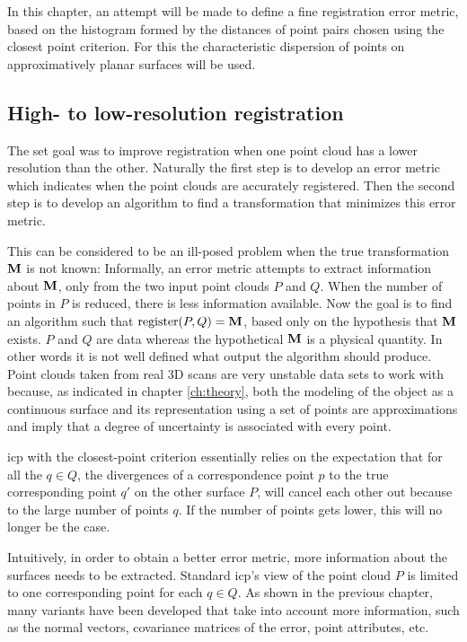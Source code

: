 In this chapter, an attempt will be made to define a fine registration error metric, based on the histogram formed by the distances of point pairs chosen using the closest point criterion. For this the characteristic dispersion of points on approximatively planar surfaces will be used.


\subsection{High- to low-resolution registration}
The set goal was to improve registration when one point cloud has a lower resolution than the other. Naturally the first step is to develop an error metric which indicates when the point clouds are accurately registered. Then the second step is to develop an algorithm to find a transformation that minimizes this error metric.

This can be considered to be an ill-posed problem when the true transformation $\mathbf{M}$ is not known: Informally, an error metric attempts to extract information about $\mathbf{M}$, only from the two input point clouds $P$ and $Q$. When the number of points in $P$ is reduced, there is less information available. Now the goal is to find an algorithm such that $\text{register}(P, Q) = \mathbf{M}$, based only on the hypothesis that $\mathbf{M}$ exists. $P$ and $Q$ are data whereas the hypothetical $\mathbf{M}$ is a physical quantity. In other words it is not well defined what output the algorithm should produce. Point clouds taken from real 3D scans are very unstable data sets to work with because, as indicated in chapter \ref{ch:theory}, both the modeling of the object as a continuous surface and its representation using a set of points are approximations and imply that a degree of uncertainty is associated with every point.

\Gls{icp} with the closest-point criterion essentially relies on the expectation that for all the $q \in Q$, the divergences of a correspondence point $p$ to the true corresponding point $q'$ on the other surface $P$, will cancel each other out because to the large number of points $q$. If the number of points gets lower, this will no longer be the case.

Intuitively, in order to obtain a better error metric, more information about the surfaces needs to be extracted. Standard \gls{icp}'s view of the point cloud $P$ is limited to one corresponding point for each $q \in Q$. As shown in the previous chapter, many variants have been developed that take into account more information, such as the normal vectors, covariance matrices of the error, point attributes, etc.

